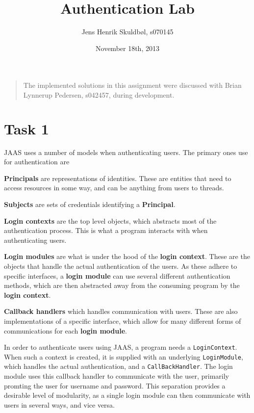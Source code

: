 \documentclass{article}
\title{Authentication Lab}
\author{Jens Henrik Skuldbøl, s070145}
\date{November 18th, 2013}
\begin{document}
\maketitle
\thispagestyle{empty}

\begin{quote}
	The implemented solutions in this assignment were discussed
	with Brian Lynnerup Pedersen, s042457, during development.
\end{quote}

\newpage

\section{Task 1}
JAAS uses a number of models when authenticating users.
The primary ones use for authentication are

\begin{itemize*}
	\item \textbf{Principals} are representations of identities.
		These are entities that need to access resources in some way,
		and can be anything from users to threads.
	\item \textbf{Subjects} are sets of credentials identifying a \textbf{Principal}.
	\item \textbf{Login contexts} are the top level objects, which abstracts most of
		the authentication process. This is what a program interacts with when 
		authenticating users.
	\item \textbf{Login modules} are what is under the hood of the \textbf{login context}.
		These are the objects that handle the actual authentication of the users.
		As these adhere to specific interfaces, a \textbf{login module} can use several 
		different authentication methods, which are then abstracted away from the consuming
		program by the \textbf{login context}.
	\item \textbf{Callback handlers} which handles communication with users. These are
		also implementations of a specific interface, which allow for many different forms
		of communications for each \textbf{login module}.
\end{itemize*}

In order to authenticate users using JAAS, a program needs a \texttt{LoginContext}.
When such a context is created, it is supplied with an underlying \texttt{LoginModule},
which handles the actual authentication, and a \texttt{CallBackHandler}.
The login module uses this callback handler to communicate with the user,
primarily promting the user for username and password.
This separation provides a desirable level of modularity, as a single login module
can then communicate with users in several ways, and vice versa.
\end{document}
